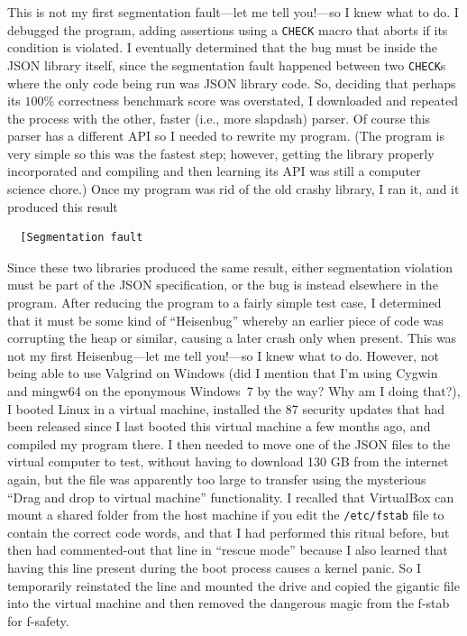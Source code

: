 \documentclass[twocolumn]{article}
\begin{document}
This is not my first segmentation fault---let me tell you!---so I knew
what to do. I debugged the program, adding assertions using a
\verb+CHECK+ macro that aborts if its condition is violated. I
eventually determined that the bug must be inside the JSON library
itself, since the segmentation fault happened between two
\verb+CHECK+s where the only code being run was JSON library code. So,
deciding that perhaps its $100\%$ correctness benchmark score was
overstated, I downloaded and repeated the process with the other,
faster (i.e., more slapdash) parser. Of course this parser has a
different API so I needed to rewrite my program. (The program is very
simple so this was the fastest step; however, getting the library
properly incorporated and compiling and then learning its API was
still a computer science chore.) Once my program was rid of the old
crashy library, I ran it, and it produced this result
\begin{verbatim}
  [Segmentation fault
\end{verbatim}
Since these two libraries produced the same result, either
segmentation violation must be part of the JSON specification, or the
bug is instead elsewhere in the program. After reducing the program to
a fairly simple test case, I determined that it must be some kind of
``Heisenbug'' whereby an earlier piece of code was corrupting the heap
or similar, causing a later crash only when present. This was not my
first Heisenbug---let me tell you!---so I knew what to do. However,
not being able to use Valgrind on Windows (did I mention that I'm
using Cygwin and mingw64 on the eponymous Windows~7 by the way? Why am
I doing that?), I booted Linux in a virtual machine, installed the 87
security updates that had been released since I last booted this
virtual machine a few months ago, and compiled my program there. I
then needed to move one of the JSON files to the virtual computer to
test, without having to download 130 GB from the internet again, but
the file was apparently too large to transfer using the mysterious
``Drag and drop to virtual machine'' functionality. I recalled that
VirtualBox can mount a shared folder from the host machine if you edit
the \verb+/etc/fstab+ file to contain the correct code words, and
that I had performed this ritual before, but then had commented-out
that line in ``rescue mode'' because I also learned that having this
line present during the boot process causes a kernel panic. So I
temporarily reinstated the line and mounted the drive and copied the
gigantic file into the virtual machine and then removed the dangerous
magic from the f-stab for f-safety.
\end{document}

